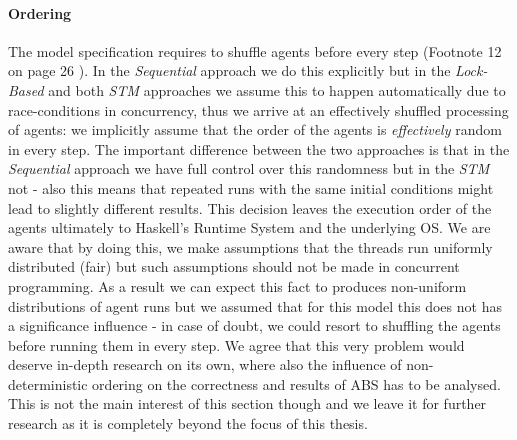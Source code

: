 \paragraph{Ordering} The model specification requires to shuffle agents before every step (Footnote 12 on page 26 \cite{epstein_growing_1996}). In the \textit{Sequential} approach we do this explicitly but in the \textit{Lock-Based} and both \textit{STM} approaches we assume this to happen automatically due to race-conditions in concurrency, thus we arrive at an effectively shuffled processing of agents: we implicitly assume that the order of the agents is \textit{effectively} random in every step. The important difference between the two approaches is that in the \textit{Sequential} approach we have full control over this randomness but in the \textit{STM} not - also this means that repeated runs with the same initial conditions might lead to slightly different results. 
This decision leaves the execution order of the agents ultimately to Haskell's Runtime System and the underlying OS. We are aware that by doing this, we make assumptions that the threads run uniformly distributed (fair) but such assumptions should not be made in concurrent programming. As a result we can expect this fact to produces non-uniform distributions of agent runs but we assumed that for this model this does not has a significance influence - in case of doubt, we could resort to shuffling the agents before running them in every step. We agree that this very problem would deserve in-depth research on its own, where also the influence of non-deterministic ordering on the correctness and results of ABS has to be analysed. This is not the main interest of this section though and we leave it for further research as it is completely beyond the focus of this thesis.


